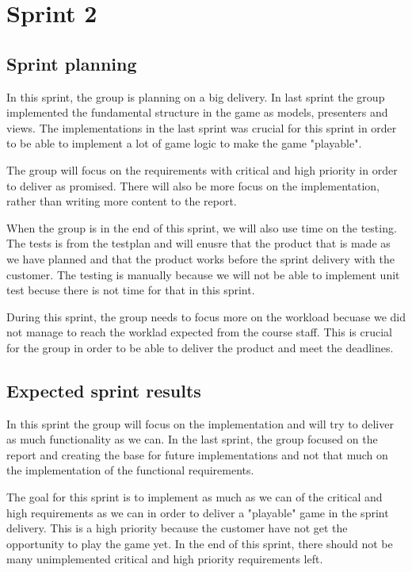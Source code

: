 \section{Sprint 2}

\subsection{Sprint planning}
	In this sprint, the group is planning on a big delivery. In last sprint the group
	implemented the fundamental structure in the game as models, presenters and views. 
	The implementations in the last sprint was crucial for this sprint in order to 
	be able to implement a lot of game logic to make the game "playable".

	The group will focus on the requirements with critical and high priority in order
	to deliver as promised. There will also be more focus on the implementation, rather
	than writing more content to the report.

	When the group is in the end of this sprint, we will also use time on the testing.
	The tests is from the testplan and will enusre that the product that is made
	as we have planned and that the product works before the sprint delivery with the customer. 
	The testing is manually because we will not be able to implement unit test becuse
	there is not time for that in this sprint.

	During this sprint, the group needs to focus more on the workload becuase we did
	not manage to reach the worklad expected from the course staff. This is crucial
	for the group in order to be able to deliver the product and meet the deadlines.

\subsection{Expected sprint results}
	In this sprint the group will focus on the implementation and will try to deliver
	as much functionality as we can. In the last sprint, the group focused on the report and creating
	the base for future implementations	and not that much on the implementation of the 
	functional requirements. 

	The goal for this sprint is to implement as much as we can of the critical and 
	high requirements as we can in order to deliver a "playable" game in the sprint delivery.
	This is a high priority because the customer have not get the opportunity to 
	play the game yet. 
	In the end of this sprint, there should not be many unimplemented critical and high 
	priority requirements left. 

